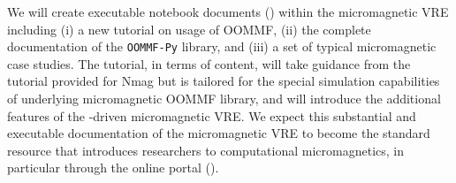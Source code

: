 \begin{workpackage}
\begin{tasklist}
\begin{task}[lead=USO,title=Demonstrator: micromagnetic VRE notebooks,
  id=oommf-tutorial-and-documentation, PM=6, partners={SR,PS}]
  We will create executable notebook documents () within the micromagnetic VRE
  including (i) a new tutorial on usage of OOMMF, (ii) the complete
  documentation of the \texttt{OOMMF-Py} library, and (iii) a set of
  typical micromagnetic case studies. The tutorial, in terms of
  content, will take guidance from the tutorial provided for Nmag
  \cite{Nmag-tutorial-url} but is tailored for the special simulation
  capabilities of underlying micromagnetic OOMMF library, and will
  introduce the additional features of the \Jupyter-driven
  micromagnetic VRE. We expect this substantial and executable
  documentation of the micromagnetic VRE to become the standard
  resource that introduces researchers to computational
  micromagnetics, in particular through the online portal ().


\end{task}

\begin{task}[lead=USO,id=oommf-nb-ve,title=Online portal for
  micromagnetic VRE demonstrator,PM=3, partners={SR,JU}]


\end{task}
\end{tasklist}
\end{workpackage}
